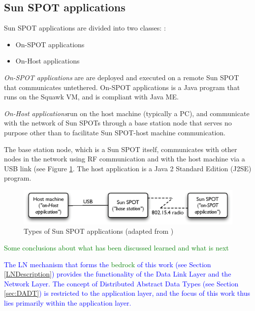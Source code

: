 \subsection{Sun SPOT applications} \label{subsec:sunspotapps}

Sun SPOT applications are divided into two classes:
\cite{sun_developer:2008}:

\begin{itemize}
  \item On-SPOT applications
  \item On-Host applications
\end{itemize}

\emph{On-SPOT applications} are are deployed and
executed on a remote Sun SPOT that communicates untethered. On-SPOT
applications is a Java program that runs on the Squawk VM, and is compliant
with Java ME. 

\emph{On-Host applications}run on the host machine
(typically a PC), and communicate with the network of Sun SPOTs through a base
station node that serves no purpose other than to facilitate Sun SPOT-host
machine communication. 
  
The base station node, which is a Sun SPOT itself, communicates with other
nodes in the network using RF communication and with the host machine via a
USB link (see Figure \ref{Fig:SunSPOTS_applications}. The host application is a Java 2 Standard
Edition (J2SE) program.
  
\begin{figure}
\centering
\includegraphics[width=\textwidth]{img/SunSPOTS_applications.eps} 
\caption[Types of Sun SPOT applications]{Types of Sun SPOT applications (adapted from
\cite{sun_developer:2008})}
\label{Fig:SunSPOTS_applications}
\end{figure}   

\textcolor{green}{Some conclusions about what has been discussed learned and
what is next}


\textcolor{blue}{The LN mechanism that forms the \textcolor{green}{bedrock} of this work (see Section \ref{LNDescription}) provides the functionality of the Data Link Layer and the Network Layer. The concept of Distributed Abstract
Data Types (see Section \ref{sec:DADT}) is restricted to the application layer, and the focus of this work thus lies primarily within the application layer.}

  